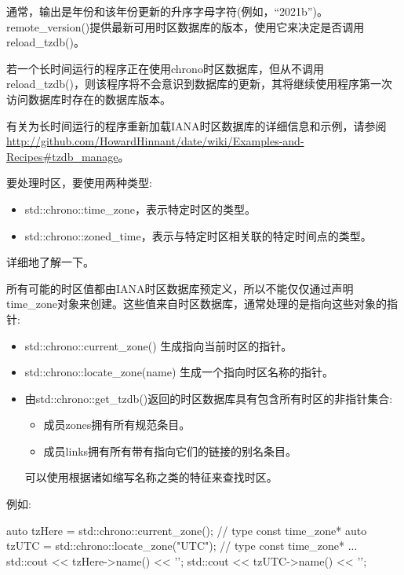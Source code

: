 通常，输出是年份和该年份更新的升序字母字符(例如，“2021b”)。remote\_version()提供最新可用时区数据库的版本，使用它来决定是否调用reload\_tzdb()。

若一个长时间运行的程序正在使用chrono时区数据库，但从不调用reload\_tzdb()，则该程序将不会意识到数据库的更新，其将继续使用程序第一次访问数据库时存在的数据库版本。

有关为长时间运行的程序重新加载IANA时区数据库的详细信息和示例，请参阅\url{http://github.com/HowardHinnant/date/wiki/Examples-and-Recipes#tzdb_manage}。


要处理时区，要使用两种类型:

\begin{itemize}
\item
std::chrono::time\_zone，表示特定时区的类型。

\item
std::chrono::zoned\_time，表示与特定时区相关联的特定时间点的类型。
\end{itemize}

详细地了解一下。


所有可能的时区值都由IANA时区数据库预定义，所以不能仅仅通过声明time\_zone对象来创建。这些值来自时区数据库，通常处理的是指向这些对象的指针:

\begin{itemize}
\item
std::chrono::current\_zone() 生成指向当前时区的指针。

\item
std::chrono::locate\_zone(name) 生成一个指向时区名称的指针。

\item
由std::chrono::get\_tzdb()返回的时区数据库具有包含所有时区的非指针集合:

\begin{itemize}
\item
成员zones拥有所有规范条目。

\item
成员links拥有所有带有指向它们的链接的别名条目。
\end{itemize}

可以使用根据诸如缩写名称之类的特征来查找时区。
\end{itemize}

例如:

\begin{cpp}
auto tzHere = std::chrono::current_zone(); // type const time_zone*
auto tzUTC = std::chrono::locate_zone("UTC"); // type const time_zone*
...
std::cout << tzHere->name() << '\n';
std::cout << tzUTC->name() << '\n';
\end{cpp}

